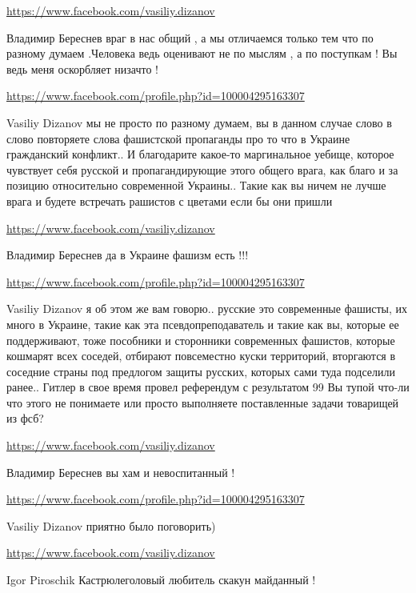 \documentclass[a4paper,11pt]{extreport}
\begin{document}
\begin{itemize}
\begin{itemize}
\url{https://www.facebook.com/vasiliy.dizanov}

Владимир Береснев враг в нас общий , а мы отличаемся только тем что по разному думаем .Человека ведь оценивают не по мыслям , а по поступкам ! Вы ведь меня оскорбляет низачто !

\url{https://www.facebook.com/profile.php?id=100004295163307}

Vasiliy Dizanov мы не просто по разному думаем, вы в данном случае слово в слово повторяете слова фашистской пропаганды про то что в Украине гражданский конфликт..
И благодарите какое-то маргинальное уебище, которое чувствует себя русской и пропагандирующие этого общего врага, как благо и за позицию относительно современной Украины..
Такие как вы ничем не лучше врага и будете встречать рашистов с цветами если бы они пришли

\url{https://www.facebook.com/vasiliy.dizanov}

Владимир Береснев да в Украине фашизм есть !!!

\url{https://www.facebook.com/profile.php?id=100004295163307}

Vasiliy Dizanov я об этом же вам говорю.. русские это современные фашисты, их много в Украине, такие как эта псевдопреподаватель и такие как вы, которые ее поддерживают, тоже пособники и сторонники современных фашистов, которые кошмарят всех соседей, отбирают повсеместно куски территорий, вторгаются в соседние страны под предлогом защиты русских, которых сами туда подселили ранее..
Гитлер в свое время провел референдум с результатом 99%
Вы тупой что-ли что этого не понимаете или просто выполняете поставленные задачи товарищей из фсб?

\url{https://www.facebook.com/vasiliy.dizanov}

Владимир Береснев вы хам и невоспитанный !

\url{https://www.facebook.com/profile.php?id=100004295163307}

Vasiliy Dizanov приятно было поговорить)

\url{https://www.facebook.com/vasiliy.dizanov}

Igor Piroschik Кастрюлеголовый любитель скакун майданный !


\end{itemize}
\end{itemize}
\end{document}
